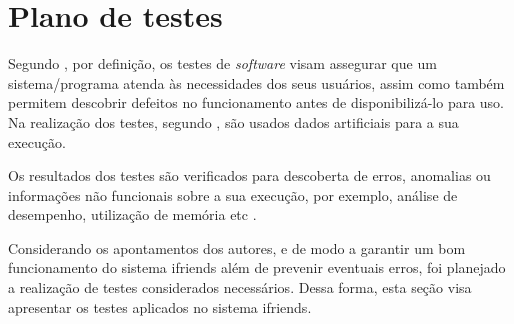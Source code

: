 
\section{Plano de testes}
Segundo , por definição, os testes de \textit{software} visam assegurar que um sistema/programa atenda às necessidades dos seus usuários, assim como também permitem descobrir defeitos no funcionamento antes de disponibilizá-lo para uso. Na realização dos testes, segundo , são usados dados artificiais para a sua execução.

\begin{citacao}
Os resultados dos testes são verificados para descoberta de erros, anomalias ou informações não funcionais sobre a sua execução, por exemplo, análise de desempenho, utilização de memória etc \cite{Polo:2020}.
\end{citacao}

Considerando os apontamentos dos autores, e de modo a garantir um bom funcionamento do sistema \gls{ifriends} além de prevenir eventuais erros, foi planejado a realização de testes considerados necessários. Dessa forma, esta seção visa apresentar os testes aplicados no sistema \gls{ifriends}.

